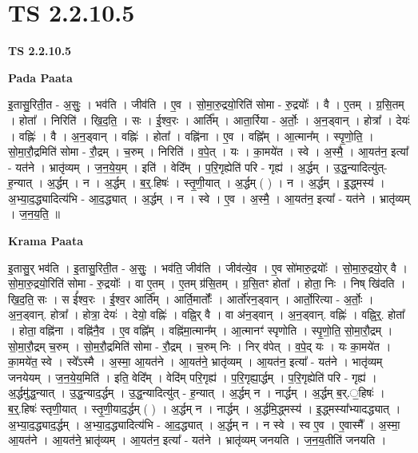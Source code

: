 \documentclass[17pt]{extarticle}
\begin{document}
\section*{ TS 2.2.10.5 }

\textbf{TS 2.2.10.5 } \newline

\textbf{Pada Paata} \newline

इ॒तासु॒रिती॒त - अ॒सुः॒ । भव॑ति । जीव॑ति । ए॒व । सो॒मा॒रु॒द्रयो॒रिति॑ सोमा - रु॒द्रयोः᳚ । वै । ए॒तम् । ग्र॒सि॒तम् । होता᳚ । निरिति॑ । खि॒द॒ति॒ । सः । ई॒श्व॒रः । आर्ति᳚म् । आता॒र्रिया - अ॒र्तोः॒ । अ॒न॒ड्वान् । होत्रा᳚ । देयः॑ । वह्निः॑ । वै । अ॒न॒ड्वान् । वह्निः॑ । होता᳚ । वह्नि॑ना । ए॒व । वह्नि᳚म् । आ॒त्मान᳚म् । स्पृ॒णो॒ति॒ । सो॒मा॒रौ॒द्रमिति॑ सोमा - रौ॒द्रम् । च॒रुम् । निरिति॑ । व॒पे॒त् । यः । का॒मये॑त । स्वे । अ॒स्मै॒ । आ॒यत॑न॒ इत्या᳚ - यत॑ने । भ्रातृ॑व्यम् । ज॒न॒ये॒य॒म् । इति॑ । वेदि᳚म् । प॒रि॒गृह्येति॑ परि - गृह्य॑ । अ॒र्द्धम् । उ॒द्ध॒न्यादित्यु॑त्-ह॒न्यात् । अ॒र्द्धम् । न । अ॒र्द्धम् । ब॒र्॒.हिषः॑ । स्तृ॒णी॒यात् । अ॒र्द्धम् ( ) । न । अ॒र्द्धम् । इ॒॒द्ध्मस्य॑ । अ॒भ्या॒द॒द्ध्यादित्य॑भि - आ॒द॒द्ध्यात् । अ॒र्द्धम् । न । स्वे । ए॒व । अ॒स्मै॒ । आ॒यत॑न॒ इत्या᳚ - यत॑ने । भ्रातृ॑व्यम् । ज॒न॒य॒ति॒ ॥  \newline


\textbf{Krama Paata} \newline

इ॒तासु॒र् भव॑ति । इ॒तासु॒रिती॒त - अ॒सुः॒ । भव॑ति॒ जीव॑ति । जीव॑त्ये॒व । ए॒व सो॑मारु॒द्रयोः᳚ । सो॒मा॒रु॒द्रयो॒र् वै । सो॒मा॒रु॒द्रयो॒रिति॑ सोमा - रु॒द्रयोः᳚ । वा ए॒तम् । ए॒तम् ग्र॑सि॒तम् । ग्र॒सि॒तꣳ होता᳚ । होता॒ निः । निष् खि॑दति । खि॒द॒ति॒ सः । स ई᳚श्व॒रः । ई॒श्व॒र आर्ति᳚म् । आर्ति॒मार्तोः᳚ । आर्तो॑रन॒ड्वान् । आर्तो॒रित्या - अ॒र्तोः॒ । अ॒न॒ड्वान्. होत्रा᳚ । होत्रा॒ देयः॑ । देयो॒ वह्निः॑ । वह्नि॒र् वै । वा अ॑न॒ड्वान् । अ॒न॒ड्वान्. वह्निः॑ । वह्नि॒र्॒. होता᳚ । होता॒ वह्नि॑ना । वह्नि॑नै॒व । ए॒व वह्नि᳚म् । वह्नि॑मा॒त्मान᳚म् । आ॒त्मानꣳ॑ स्पृणोति । स्पृ॒णो॒ति॒ सो॒मा॒रौ॒द्रम् । सो॒मा॒रौ॒द्रम् च॒रुम् । सो॒म॒रौ॒द्रमिति॑ सोमा - रौ॒द्रम् । च॒रुम् निः । निर् व॑पेत् । व॒पे॒द् यः । यः का॒मये॑त । का॒मये॑त॒ स्वे । स्वे᳚ऽस्मै । अ॒स्मा॒ आ॒यत॑ने । आ॒यत॑ने॒ भ्रातृ॑व्यम् । आ॒यत॑न॒ इत्या᳚ - यत॑ने । भातृ॑व्यम् जनयेयम् । ज॒न॒ये॒य॒मिति॑ । इति॒ वेदि᳚म् । वेदि॑म् परि॒गृह्य॑ । प॒रि॒गृह्या॒र्द्धम् । प॒रि॒गृह्येति॑ परि - गृह्य॑ । अ॒र्द्धमु॑द्ध॒न्यात् । उ॒द्ध॒न्याद॒र्द्धम् । उ॒द्ध॒न्यादित्यु॑त् - ह॒न्यात् । अ॒र्द्धम् न । नार्द्धम् । अ॒र्द्धम् ब॒र्.॒हिषः॑ । ब॒र्॒.हिषः॑ स्तृणी॒यात् । स्तृ॒णी॒याद॒र्द्धम् ( ) । अ॒र्द्धम् न । नार्द्धम् । अ॒र्द्धमि॒द्ध्मस्य॑ । इ॒द्ध्मस्या᳚भ्यादद्ध्यात् । अ॒भ्या॒द॒द्ध्याद॒र्द्धम् । अ॒भ्या॒द॒द्ध्यादित्य॑भि - आ॒द॒द्ध्यात् । अ॒र्द्धम् न । न स्वे । स्व ए॒व । ए॒वास्मै᳚ । अ॒स्मा॒ आ॒यत॑ने । आ॒यत॑ने॒ भ्रातृ॑व्यम् । आ॒यत॑न॒ इत्या᳚ - यत॑ने । भ्रातृ॑व्यम् जनयति । ज॒न॒य॒तीति॑ जनयति । \newline
\end{document}
